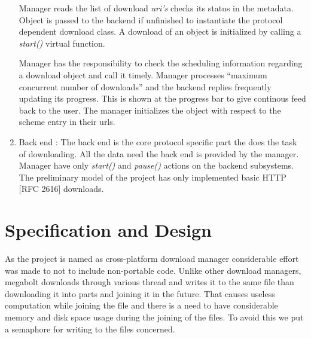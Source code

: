 \documentclass[pdftex,12pt,a4paper,pdfencoding=unicode]{article}
\begin{document}
\begin{onehalfspace}
\begin{enumerate}
         Manager reads the list of download \emph{uri's} checks its status in the metadata. Object is passed to the backend if unfinished to
         instantiate the protocol dependent download class. A download of an object is initialized by calling a \emph{start()} virtual
         function.

         Manager has the responsibility to check the scheduling information regarding a download object and call it timely. Manager
         processes ``maximum concurrent number of downloads'' and the backend replies frequently updating its progress. This is shown
         at the progress bar to give continous feed back to the user. The manager initializes the object with respect to the scheme entry
         in their urls.

       \item Back end : The back end is the core protocol specific part the does the task of downloading. All the data need the back end
         is provided by the manager. Manager have only \emph{start()} and \emph{pause()} actions on the backend subsystems. The preliminary
         model of the project has only implemented basic HTTP [RFC 2616] downloads.
       \end{enumerate}
       \newpage
       \section{Specification and Design}
       As the project is named as cross-platform download manager considerable effort was made to not to include non-portable code.
       Unlike other download managers, megabolt downloads through various thread and writes it to the same file than downloading it into
       parts and joining it in the future. That causes useless computation while joining the file and there is a need to have considerable
       memory and disk space usage during the joining of the files. To avoid this we put a semaphore for writing to the files concerned.


\end{onehalfspace}
\end{document}
